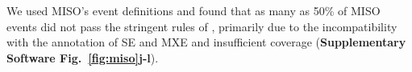 We used MISO's event definitions and found that as many as 50\% of MISO events did not pass the stringent rules of \outrigger, primarily due to the incompatibility with the annotation of SE and MXE and insufficient coverage (\textbf{Supplementary Software Fig.~\ref{fig:miso}j-l}). 






